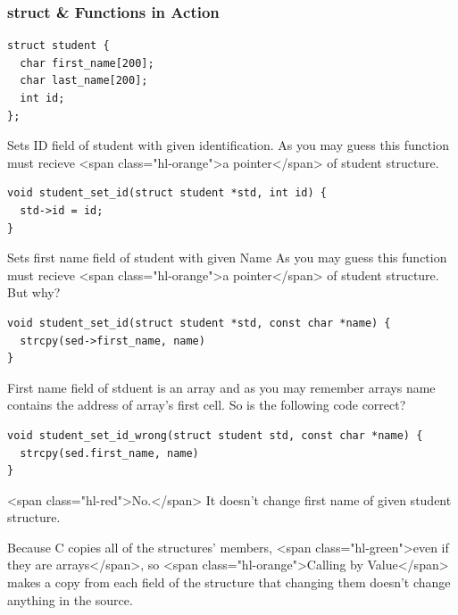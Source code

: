 \documentclass{../c-lecture}
\begin{document}
\begin{frame}[fragile]
  \frametitle{struct \& Functions in Action}
  \begin{verbatim}
struct student {
  char first_name[200];
  char last_name[200];
  int id;
};
  \end{verbatim}
\end{frame}
\begin{frame}[fragile]
  \begin{block}{}
    Sets ID field of student with given identification. As you may guess this
    function must recieve <span class="hl-orange">a pointer</span> of student
    structure.
  \end{block}
  \begin{verbatim}
void student_set_id(struct student *std, int id) {
  std->id = id;
}
  \end{verbatim}
\end{frame}
\begin{frame}[fragile]
  \begin{block}{}
      Sets first name field of student with given Name As you may guess this
      function must recieve <span class="hl-orange">a pointer</span> of student
      structure. But why?
  \end{block}
  \begin{verbatim}
void student_set_id(struct student *std, const char *name) {
  strcpy(sed->first_name, name)
}
  \end{verbatim}
\end{frame}
\begin{frame}[fragile]
  \begin{block}{}
      First name field of stduent is an array and as you may remember arrays
      name contains the address of array's first cell. So is the following code
      correct? 🤔
  \end{block}
  \begin{verbatim}
void student_set_id_wrong(struct student std, const char *name) {
  strcpy(sed.first_name, name)
}
  \end{verbatim}
  \begin{block}{}
      <span class="hl-red">No.</span> It doesn't change first name of given
      student structure.
  \end{block}
  \begin{block}{}
      Because C copies all of the structures' members,
      <span class="hl-green">even if they are arrays</span>, so
      <span class="hl-orange">Calling by Value</span> makes a copy from each
      field of the structure that changing them doesn't change anything in the
      source.
  \end{block}
\end{frame}
\end{document}
